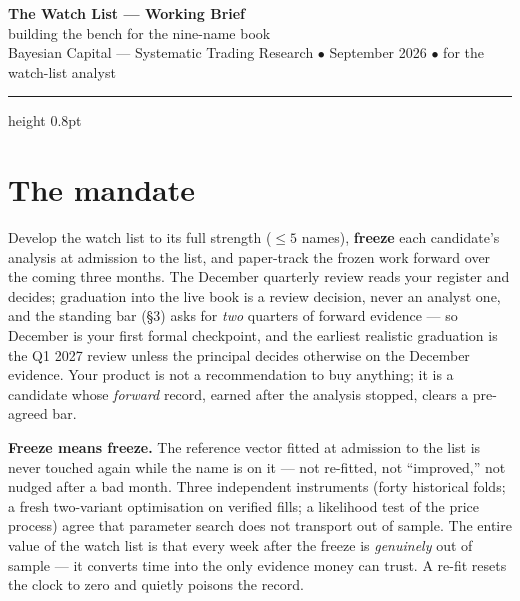 \documentclass[11pt,a4paper]{article}
\begin{document}
\begin{center}
{\Large\bfseries\color{bcnavy} The Watch List --- Working Brief}\\[0.15cm]
{\color{bcnavy} building the bench for the nine-name book}\\[0.25cm]
{\small\color{bcgrey} Bayesian Capital --- Systematic Trading Research
\;$\bullet$ September 2026 \;$\bullet$\; for the watch-list analyst}
\end{center}
\vspace{0.1cm}
{\color{bcnavy}\hrule height 0.8pt}
\vspace{0.4cm}

\section{The mandate}

Develop the watch list to its full strength ($\leq 5$ names), \textbf{freeze}
each candidate's analysis at admission to the list, and paper-track the frozen
work forward over the coming three months. The December quarterly review reads
your register and decides; graduation into the live book is a review decision,
never an analyst one, and the standing bar (\S3) asks for \emph{two} quarters
of forward evidence --- so December is your first formal checkpoint, and the
earliest realistic graduation is the Q1 2027 review unless the principal
decides otherwise on the December evidence. Your product is not a
recommendation to buy anything; it is a candidate whose \emph{forward} record,
earned after the analysis stopped, clears a pre-agreed bar.

\begin{tcolorbox}[colback=bcgold!8, colframe=bcgold, boxrule=0.8pt,
  title={\bfseries The one law}, coltitle=bcnavy]
\textbf{Freeze means freeze.} The reference vector fitted at admission to the
list is never touched again while the name is on it --- not re-fitted,
not ``improved,'' not nudged after a bad month. Three independent instruments
(forty historical folds; a fresh two-variant optimisation on verified fills; a
likelihood test of the price process) agree that parameter search does not
transport out of sample. The entire value of the watch list is that every week
after the freeze is \emph{genuinely} out of sample --- it converts time into
the only evidence money can trust. A re-fit resets the clock to zero and
quietly poisons the record.
\end{tcolorbox}
\end{document}
